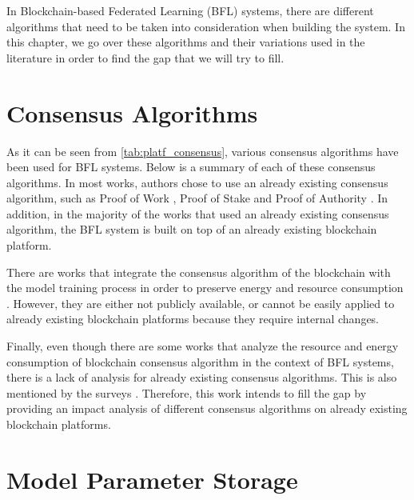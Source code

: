 In Blockchain-based Federated Learning (BFL) systems, there are different algorithms that need to be taken into consideration when building the system. In this chapter, we go over these algorithms and their variations used in the literature in order to find the gap that we will try to fill.

\section{Consensus Algorithms}\label{related_work:consensus_algorithms}

As it can be seen from \autoref{tab:platf_consensus}, various consensus algorithms have been used for BFL systems. Below is a summary of each of these consensus algorithms. In most works, authors chose to use an already existing consensus algorithm, such as Proof of Work \cite{10.48550/arxiv.2007.03856, 9233457, 8733825, 10.48550/arxiv.2112.07938, 9134967, 10.48550/arxiv.1912.04859, 9079513, 9223754, 9399813}, Proof of Stake \cite{9159643, 10.48550/arxiv.2101.03300, 8998397, 10.48550/arxiv.1912.04859, 9399813, 9170559, 9311394, 9170905} and Proof of Authority \cite{9274451, baffle, demo, 8945913}. In addition, in the majority of the works that used an already existing consensus algorithm, the BFL system is built on top of an already existing blockchain platform.

There are works \cite{9347812, 10.48550/arxiv.2007.15145, 8843900} that integrate the consensus algorithm of the blockchain with the model training process in order to preserve energy and resource consumption \cite{9293091}. However, they are either not publicly available, or cannot be easily applied to already existing blockchain platforms because they require internal changes.

Finally, even though there are some works that analyze the resource and energy consumption of blockchain consensus algorithm in the context of BFL systems, there is a lack of analysis for already existing consensus algorithms. This is also mentioned by the surveys \cite{9403374, 10.48550/arxiv.2112.07938}. Therefore, this work intends to fill the gap by providing an impact analysis of different consensus algorithms on already existing blockchain platforms.

\section{Model Parameter Storage}\label{related_work:param_storage}

